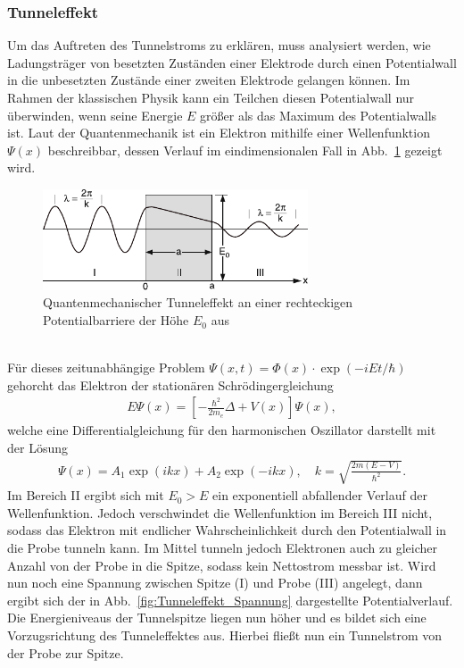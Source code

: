 \documentclass[a4paper,twoside,final]{article}
\begin{document}
\subsubsection{Tunneleffekt}
Um das Auftreten des Tunnelstroms zu erklären, muss analysiert werden, wie Ladungsträger von besetzten Zuständen einer Elektrode durch einen Potentialwall in die unbesetzten Zustände einer zweiten Elektrode gelangen können. Im Rahmen der klassischen Physik kann ein Teilchen diesen Potentialwall nur überwinden, wenn seine Energie $E$ größer als das Maximum des Potentialwalls ist. Laut der Quantenmechanik ist ein Elektron mithilfe einer Wellenfunktion $\Psi(x)$ beschreibbar, dessen Verlauf im eindimensionalen Fall in Abb.~\ref{fig:Tunneleffekt} gezeigt wird.
\begin{figure}[htp]
    \centering
    \includegraphics[width=0.7\textwidth]{Bilder/Tunneleffekt.pdf}
    \caption{Quantenmechanischer Tunneleffekt an einer rechteckigen Potentialbarriere der Höhe $E_0$ aus~\cite{Demtroeder}}
    \label{fig:Tunneleffekt}
\end{figure}\\
Für dieses zeitunabhängige Problem $\Psi(x,t) = \Phi(x)\cdot\exp(-iEt/\hbar)$ gehorcht das Elektron der stationären Schrödingergleichung
\begin{align}
  E \Psi(x) = \left[-\frac{\hbar^2}{2m_e}\Delta + V(x)\right] \Psi(x),
\end{align}
welche eine Differentialgleichung für den harmonischen Oszillator darstellt mit der Lösung
\begin{align}
  \Psi(x) = A_1 \exp(ikx) + A_2 \exp(-ikx), \quad k=\sqrt{\frac{2m(E-V)}{\hbar^2}}.
\end{align}
Im Bereich II ergibt sich mit $E_0 > E$ ein exponentiell abfallender Verlauf der Wellenfunktion. Jedoch verschwindet die Wellenfunktion im Bereich III nicht, sodass das Elektron mit endlicher Wahrscheinlichkeit durch den Potentialwall in die Probe tunneln kann. Im Mittel tunneln jedoch Elektronen auch zu gleicher Anzahl von der Probe in die Spitze, sodass kein Nettostrom messbar ist. Wird nun noch eine Spannung zwischen Spitze (I) und Probe (III) angelegt, dann ergibt sich der in Abb.~\ref{fig:Tunneleffekt_Spannung} dargestellte Potentialverlauf. Die Energieniveaus der Tunnelspitze liegen nun höher und es bildet sich eine Vorzugsrichtung des Tunneleffektes aus. Hierbei fließt nun ein Tunnelstrom von der Probe zur Spitze.
\end{document}
